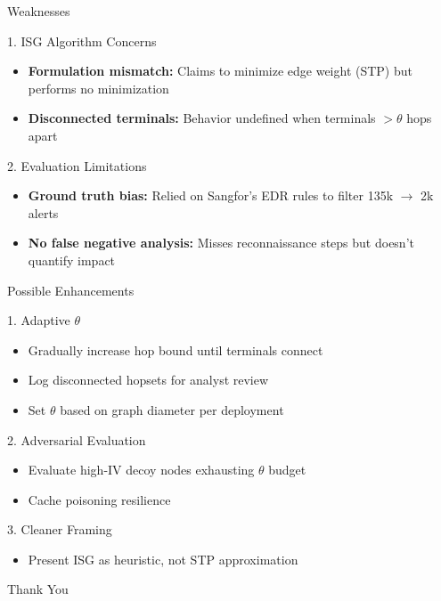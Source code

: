 \documentclass[11pt, aspectratio=169]{beamer}
\begin{document}
\begin{frame}{Weaknesses}
    \begin{alertblock}{1. ISG Algorithm Concerns}
        \begin{itemize}
            \item \textbf{Formulation mismatch:} Claims to minimize edge weight (STP) but performs no minimization
            \item \textbf{Disconnected terminals:} Behavior undefined when terminals $> \theta$ hops apart
        \end{itemize}
    \end{alertblock}
    \begin{alertblock}{2. Evaluation Limitations}
        \begin{itemize}
            \item \textbf{Ground truth bias:} Relied on Sangfor's EDR rules to filter 135k $\rightarrow$ 2k alerts
            \item \textbf{No false negative analysis:} Misses reconnaissance steps but doesn't quantify impact
        \end{itemize}
    \end{alertblock}
\end{frame}

\begin{frame}{Possible Enhancements}
    \begin{block}{1. Adaptive $\theta$}
        \begin{itemize}
            \item Gradually increase hop bound until terminals connect
            \item Log disconnected hopsets for analyst review
            \item Set $\theta$ based on graph diameter per deployment
        \end{itemize}
    \end{block}
    \begin{block}{2. Adversarial Evaluation}
        \begin{itemize}
            \item Evaluate high-IV decoy nodes exhausting $\theta$ budget
            \item Cache poisoning resilience
        \end{itemize}
    \end{block}
    \begin{block}{3. Cleaner Framing}
        \begin{itemize}
            \item Present ISG as heuristic, not STP approximation
        \end{itemize}
    \end{block}
\end{frame}

\begin{frame}
    \begin{center}
        \Huge Thank You
        \vspace{1cm}
    \end{center}
\end{frame}
\end{document}
